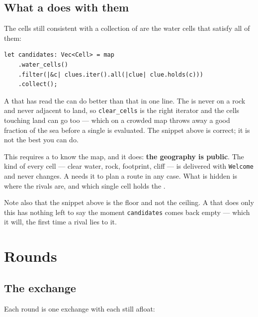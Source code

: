 \documentclass{article}
\begin{document}
\subsection{What a \ship{} does with them}

The cells still consistent with a collection of \clues{} are the water cells that satisfy all of
them:

\begin{lstlisting}
let candidates: Vec<Cell> = map
    .water_cells()
    .filter(|&c| clues.iter().all(|clue| clue.holds(c)))
    .collect();
\end{lstlisting}

A \ship{} that has read the \MD{} can do better than that in one line. The \treasure{} is never on
a rock and never adjacent to land, so \texttt{clear\_cells} is the right iterator and the cells
touching land can go too --- which on a crowded map throws away a good fraction of the sea before
a single \clue{} is evaluated. The snippet above is correct; it is not the best you can do.

This requires a \ship{} to know the map, and it does: \textbf{the geography is public}. The kind of
every cell --- clear water, rock, \island{} footprint, cliff --- is delivered with
\texttt{Welcome} and never changes. A \ship{} needs it to plan a route in any case. What is hidden
is where the rivals are, and which single cell holds the \treasure{}.

Note also that the snippet above is the floor and not the ceiling. A \ship{} that does only this has
nothing left to say the moment \texttt{candidates} comes back empty --- which it will, the first
time a rival lies to it.

\newpage
\section{Rounds}
\label{proto:rounds}

\subsection{The exchange}

Each round is one exchange with each \ship{} still afloat:
\end{document}

